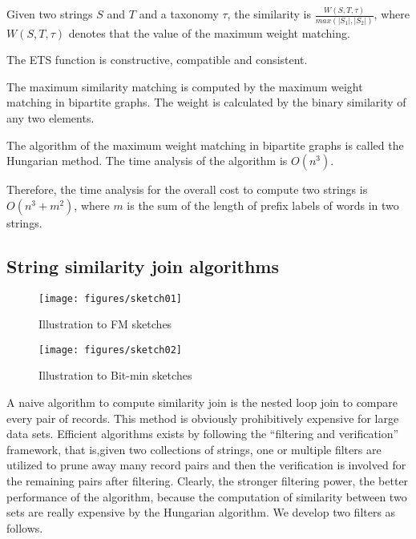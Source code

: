 \begin{definition}  Given two strings $S$ and $T$ and a taxonomy $\tau$, the similarity is   $\frac{W(S,T,\tau)}{max(|S_1|,|S_2|)}$, where $W(S,T,\tau)$ denotes that the value of the maximum weight matching.  \label{def:efs}
\end{definition}

\smallskip

\begin{lem}  The ETS function is constructive, compatible and consistent.
\end{lem}

The maximum  similarity  matching is computed by the maximum weight matching in bipartite graphs. The weight is calculated by the binary similarity of any two elements.

The algorithm of the maximum weight matching in bipartite graphs is called the Hungarian method. The time analysis of the algorithm is $O(n^3)$.


Therefore, the  time analysis for the overall cost to compute two strings is $O(n^3+m^2)$, where $m$ is the sum of the length of prefix labels of words in two strings.





\subsection{String similarity join algorithms}


\begin{figure}[t]
\centering
\texttt{[image: figures/sketch01]}
 \caption{Illustration to FM sketches }
\label{fig:similaritygeaph}
\end{figure}


\begin{figure}
\centering
\texttt{[image: figures/sketch02]}
 \caption{Illustration to Bit-min sketches }
\label{fig:similaritygeaph}
\end{figure}

A naive algorithm to compute similarity join is the nested loop join to compare every pair of records. This method is obviously prohibitively expensive for large data sets. Efficient algorithms exists by following the ``filtering and verification'' framework, that is,given two collections of strings, one or multiple filters are utilized to prune away many record pairs and then the verification is involved for the remaining pairs after filtering. Clearly, the stronger filtering power, the better performance of the algorithm, because the computation of similarity between two sets are really expensive by the Hungarian algorithm. We develop two filters as follows.

